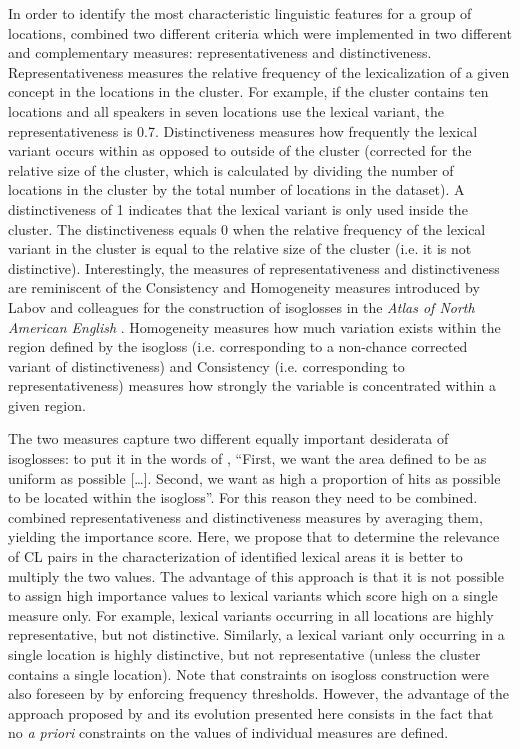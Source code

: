 \documentclass[output=paper]{LSP/langsci}
\begin{document}
In order to identify the most characteristic linguistic features for a group of locations, \citet{wieling_bipartite_2011} combined two different criteria which were implemented in two different and complementary measures: representativeness and distinctiveness. Representativeness measures the relative frequency of the lexicalization of a given concept in the locations in the cluster. For example, if the cluster contains ten locations and all speakers in seven locations use the lexical variant, the representativeness is 0.7. Distinctiveness measures how frequently the lexical variant occurs within as opposed to outside of the cluster (corrected for the relative size of the cluster, which is calculated by dividing the number of locations in the cluster by the total number of locations in the dataset). A distinctiveness of 1 indicates that the lexical variant is only used inside the cluster. The distinctiveness equals 0 when the relative frequency of the lexical variant in the cluster is equal to the relative size of the cluster (i.e. it is not distinctive). Interestingly, the measures of representativeness and distinctiveness are reminiscent of the Consistency and Homogeneity measures introduced by Labov and colleagues for the construction of isoglosses in the \textit{Atlas of North American English} \citep{labov_atlas_2006-1}. Homogeneity measures how much variation exists within the region defined by the isogloss (i.e. corresponding to a non-chance corrected variant of distinctiveness) and Consistency (i.e. corresponding to representativeness) measures how strongly the variable is concentrated within a given region.

The two measures capture two different equally important desiderata of isoglosses: to put it in the words of \citet{labov_atlas_2006-1}, “First, we want the area defined to be as uniform as possible […]. Second, we want as high a proportion of hits as possible to be located within the isogloss”. For this reason they need to be combined. \citet{wieling_bipartite_2011} combined representativeness and distinctiveness measures by averaging them, yielding the importance score. Here, we propose that to determine the relevance of CL pairs in the characterization of identified lexical areas it is better to multiply the two values. The advantage of this approach is that it is not possible to assign high importance values to lexical variants which score high on a single measure only. For example, lexical variants occurring in all locations are highly representative, but not distinctive. Similarly, a lexical variant only occurring in a single location is highly distinctive, but not representative (unless the cluster contains a single location). Note that constraints on isogloss construction were also foreseen by \citet{labov_atlas_2006-1} by enforcing frequency thresholds. However, the advantage of the approach proposed by \citet{wieling_bipartite_2011} and its evolution presented here consists in the fact that no \textit{a priori} constraints on the values of individual measures are defined.
\end{document}
